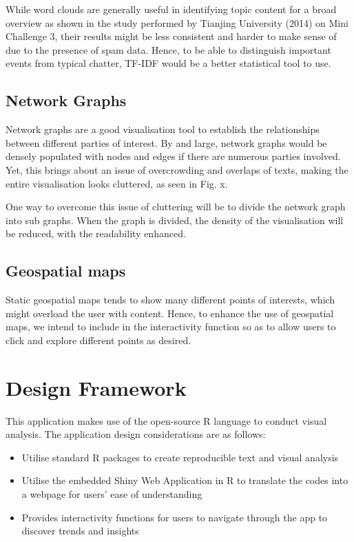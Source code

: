\documentclass{acm_proc_article-sp}
\providecommand{\tightlist}{%
  \setlength{\itemsep}{0pt}\setlength{\parskip}{0pt}}
\begin{document}
While word clouds are generally useful in identifying topic content for
a broad overview as shown in the study performed by Tianjing University
(2014) on Mini Challenge 3, their results might be less consistent and
harder to make sense of due to the presence of spam data. Hence, to be
able to distinguish important events from typical chatter, TF-IDF would
be a better statistical tool to use.

\hypertarget{network-graphs}{%
\subsection{Network Graphs}\label{network-graphs}}

Network graphs are a good visualisation tool to establish the
relationships between different parties of interest. By and large,
network graphs would be densely populated with nodes and edges if there
are numerous parties involved. Yet, this brings about an issue of
overcrowding and overlaps of texts, making the entire visualisation
looks cluttered, as seen in Fig. x.

One way to overcome this issue of cluttering will be to divide the
network graph into sub graphs. When the graph is divided, the density of
the visualisation will be reduced, with the readability enhanced.

\hypertarget{geospatial-maps}{%
\subsection{Geospatial maps}\label{geospatial-maps}}

Static geospatial maps tends to show many different points of interests,
which might overload the user with content. Hence, to enhance the use of
geospatial maps, we intend to include in the interactivity function so
as to allow users to click and explore different points as desired.

\hypertarget{design-framework}{%
\section{Design Framework}\label{design-framework}}

This application makes use of the open-source R language to conduct
visual analysis. The application design considerations are as follows:

\begin{itemize}
\tightlist
\item
  Utilise standard R packages to create reproducible text and visual
  analysis
\item
  Utilise the embedded Shiny Web Application in R to translate the codes
  into a webpage for users' ease of understanding\\
\item
  Provides interactivity functions for users to navigate through the app
  to discover trends and insights
\end{itemize}
\end{document}
